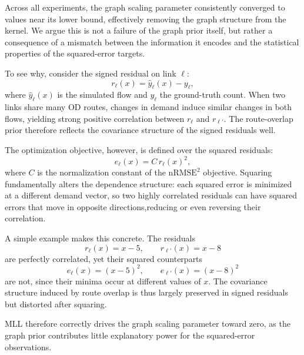 \documentclass[11pt]{article}
\begin{document}
Across all experiments, the graph scaling parameter consistently converged to values near its lower bound, effectively removing the graph structure from the kernel. We argue this is not a failure of the graph prior itself, but rather a consequence of a mismatch between the information it encodes and the statistical properties of the squared-error targets.

To see why, consider the signed residual on link $\ell$:
\begin{equation}
    r_\ell(x) = \hat{y}_\ell(x) - y_\ell,
\end{equation}
where $\hat{y}_\ell(x)$ is the simulated flow and $y_\ell$ the ground-truth count. When two links share many OD routes, changes in demand induce similar changes in both flows, yielding strong positive correlation between $r_\ell$ and $r_{\ell'}$. The route-overlap prior therefore reflects the covariance structure of the signed residuals well.

The optimization objective, however, is defined over the squared residuals:
\begin{equation}
    e_\ell(x) = C \, r_\ell(x)^2,
\end{equation}
where $C$ is the normalization constant of the $\mathrm{nRMSE}^2$ objective. Squaring fundamentally alters the dependence structure: each squared error is minimized at a different demand vector, so two highly correlated residuals can have squared errors that move in opposite directions,reducing or even reversing their correlation.

A simple example makes this concrete. The residuals
\begin{equation}
    r_\ell(x) = x - 5, \qquad r_{\ell'}(x) = x - 8
\end{equation}
are perfectly correlated, yet their squared counterparts
\begin{equation}
    e_\ell(x) = (x-5)^2, \qquad e_{\ell'}(x) = (x-8)^2
\end{equation}
are not, since their minima occur at different values of $x$. The covariance structure induced by route overlap is thus largely preserved in signed residuals but distorted after squaring.

MLL therefore correctly drives the graph scaling parameter toward zero, as the graph prior contributes little explanatory power for the squared-error observations.
\end{document}

